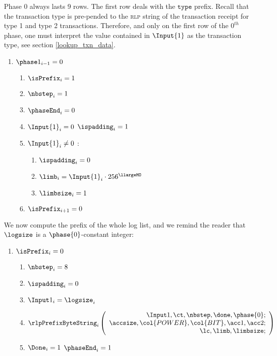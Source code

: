 \begin{center}
\end{center}

Phase 0 always lasts 9 rows.
The first row deals with the $\texttt{type}$ prefix. Recall that the transaction type is pre-pended to the \textsc{rlp} string of the transaction receipt for type 1 and type 2 transactions.
Therefore, and only on the first row of the $0^{th}$ phase, one must interpret the value contained in $\Input{1}$ as the transaction type, see section \ref{lookup_txn_data}.
\begin{enumerate}
	\item \If $\phase1_{i-1}=0$ \Then
		\begin{enumerate}
			\item $\isPrefix_{i}=1$
			\item $\nbstep_{i}=1$
			\item $\phaseEnd_{i}=0$
			\item \If $\Input{1}_{i}=0$ \Then $\ispadding_{i}=1$
			\item \If $\Input{1}_{i} \neq 0$ \Then:
				\begin{enumerate}
					\item $\ispadding_{i}=0$
					\item $\limb_{i}=\Input{1}_{i}\cdot256^{\llargeMO}$ 
					\item $\limbsize_{i}=1$
				\end{enumerate}
			\item $\isPrefix_{i+1}=0$ 
		\end{enumerate}
\end{enumerate}
We now compute the \rlp{} prefix of the whole log list, and we remind the reader that $\logsize$ is a $\phase{0}$-constant integer:
\begin{enumerate}[resume]
	\item \If $\isPrefix_{i}=0$ \Then
		\begin{enumerate}
			\item $\nbstep_{i}=8$
			\item $\ispadding_{i}=0$
			\item $\Input1_{i} = \logsize_{i}$
			\item 
				\[
					\rlpPrefixByteString_{i}
					\left(
					\begin{array}{r}
						\Input1,
						\ct,
						\nbstep,
						\done,
						\phase{0}; \\
						\accsize,
						\col{POWER},
						\col{BIT},
						\acc1,
						\acc2; \\
						\lc,
						\limb,
						\limbsize; \\
					\end{array}
					\right)
				\]
			\item \If $\Done_{i}=1$ \Then $\phaseEnd_{i}=1$
		\end{enumerate}
\end{enumerate}
